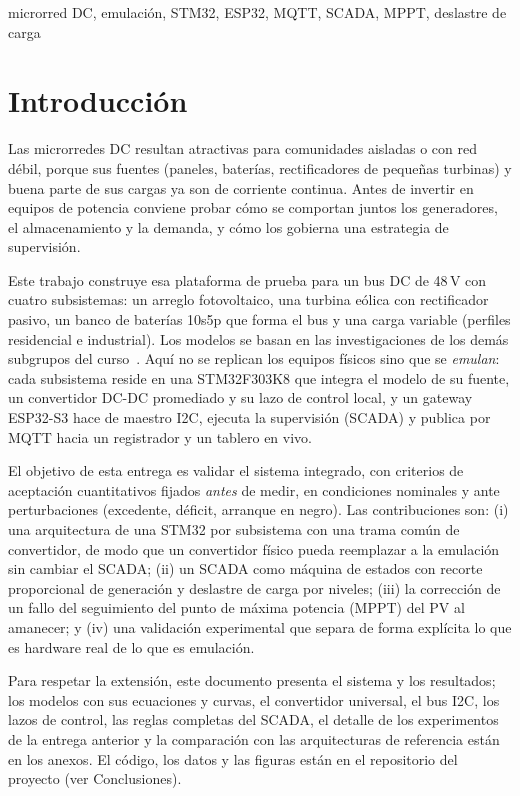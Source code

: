 \documentclass[conference]{IEEEtran}
\begin{document}
\begin{IEEEkeywords}
microrred DC, emulación, STM32, ESP32, MQTT, SCADA, MPPT, deslastre de carga
\end{IEEEkeywords}

\section{Introducción}

Las microrredes DC resultan atractivas para comunidades aisladas o con red débil, porque sus fuentes (paneles, baterías, rectificadores de pequeñas turbinas) y buena parte de sus cargas ya son de corriente continua. Antes de invertir en equipos de potencia conviene probar cómo se comportan juntos los generadores, el almacenamiento y la demanda, y cómo los gobierna una estrategia de supervisión.

Este trabajo construye esa plataforma de prueba para un bus DC de 48\,V con cuatro subsistemas: un arreglo fotovoltaico, una turbina eólica con rectificador pasivo, un banco de baterías 10s5p que forma el bus y una carga variable (perfiles residencial e industrial). Los modelos se basan en las investigaciones de los demás subgrupos del curso~\cite{aristizabal2026pv,gonzalez2026eolica,vega2026bateria,hernandez2026carga}. Aquí no se replican los equipos físicos sino que se \emph{emulan}: cada subsistema reside en una STM32F303K8 que integra el modelo de su fuente, un convertidor DC-DC promediado y su lazo de control local, y un gateway ESP32-S3 hace de maestro I2C, ejecuta la supervisión (SCADA) y publica por MQTT hacia un registrador y un tablero en vivo.

El objetivo de esta entrega es validar el sistema integrado, con criterios de aceptación cuantitativos fijados \emph{antes} de medir, en condiciones nominales y ante perturbaciones (excedente, déficit, arranque en negro). Las contribuciones son: (i) una arquitectura de una STM32 por subsistema con una trama común de convertidor, de modo que un convertidor físico pueda reemplazar a la emulación sin cambiar el SCADA; (ii) un SCADA como máquina de estados con recorte proporcional de generación y deslastre de carga por niveles; (iii) la corrección de un fallo del seguimiento del punto de máxima potencia (MPPT) del PV al amanecer; y (iv) una validación experimental que separa de forma explícita lo que es hardware real de lo que es emulación.

Para respetar la extensión, este documento presenta el sistema y los resultados; los modelos con sus ecuaciones y curvas, el convertidor universal, el bus I2C, los lazos de control, las reglas completas del SCADA, el detalle de los experimentos de la entrega anterior y la comparación con las arquitecturas de referencia están en los anexos. El código, los datos y las figuras están en el repositorio del proyecto (ver Conclusiones).
\end{document}

